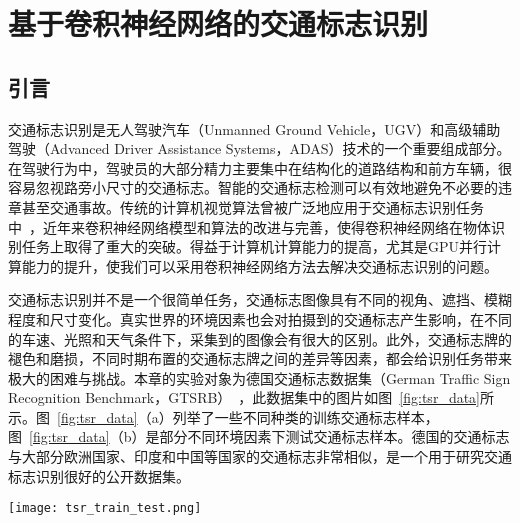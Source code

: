 \chapter{基于卷积神经网络的交通标志识别}
\label{cha:seg}

\section{引言}
\label{sec:seg:introduction}

交通标志识别是无人驾驶汽车（Unmanned Ground Vehicle，UGV）和高级辅助驾驶（Advanced Driver Assistance Systems，ADAS）技术的一个重要组成部分。在驾驶行为中，驾驶员的大部分精力主要集中在结构化的道路结构和前方车辆，很容易忽视路旁小尺寸的交通标志。智能的交通标志检测可以有效地避免不必要的违章甚至交通事故。传统的计算机视觉算法曾被广泛地应用于交通标志识别任务中~\cite{le2010real}，近年来卷积神经网络模型和算法的改进与完善，使得卷积神经网络在物体识别任务上取得了重大的突破。得益于计算机计算能力的提高，尤其是GPU并行计算能力的提升，使我们可以采用卷积神经网络方法去解决交通标志识别的问题。

交通标志识别并不是一个很简单任务，交通标志图像具有不同的视角、遮挡、模糊程度和尺寸变化。真实世界的环境因素也会对拍摄到的交通标志产生影响，在不同的车速、光照和天气条件下，采集到的图像会有很大的区别。此外，交通标志牌的褪色和磨损，不同时期布置的交通标志牌之间的差异等因素，都会给识别任务带来极大的困难与挑战。本章的实验对象为德国交通标志数据集（German Traffic Sign Recognition Benchmark，GTSRB）~\cite{stallkamp2012man}，此数据集中的图片如图~\ref{fig:tsr_data}所示。图~\ref{fig:tsr_data}（a）列举了一些不同种类的训练交通标志样本，图~\ref{fig:tsr_data}（b）是部分不同环境因素下测试交通标志样本。德国的交通标志与大部分欧洲国家、印度和中国等国家的交通标志非常相似，是一个用于研究交通标志识别很好的公开数据集。

\begin{figure*}[t]
\centering
\texttt{[image: tsr\_train\_test.png]}
\caption{GTSRB图像样本。图中（a）是一些不同种类的训练交通标志样本，（b）是部分不同环境因素下测试交通标志样本。交通标志图像具有不同的视角、遮挡、模糊程度和尺寸变化。真实世界的环境因素也会对拍摄到的交通标志产生影响，在不同的车速、光照和天气条件下，采集到的图像会有很大的区别。此外，交通标志牌的褪色和磨损，不同时期布置的交通标志牌之间的差异等因素，都会给识别任务带来极大的困难与挑战。}
\label{fig:tsr_data}
\end{figure*}


